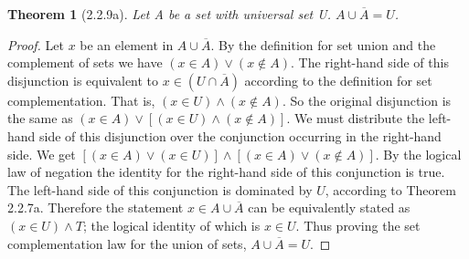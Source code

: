 \documentclass[a4paper, 12pt]{article}
\theoremstyle{plain}
\newtheorem*{theorem*}{Theorem}
\begin{document}
	
	\begin{theorem*}[2.2.9a]
		Let A be a set with universal set U. $A \cup \overline{A} = U$.
	\end{theorem*}
	
	\begin{proof}
		Let $x$ be an element in $A \cup \overline{A}$. By the definition for set union and the complement of sets we have $(x \in A) \lor (x \notin A)$. The right-hand side of this disjunction is equivalent to $x \in (U \cap \overline{A})$ according to the definition for set complementation. That is, $(x \in U) \land (x \notin A)$. So the original disjunction is the same as $(x \in A) \lor [(x \in U) \land (x \notin A)]$. We must distribute the left-hand side of this disjunction over the conjunction occurring in the right-hand side. We get $[(x \in A) \lor (x \in U)] \land [(x \in A) \lor (x \notin A)]$. By the logical law of negation the identity for the right-hand side of this conjunction is true. The left-hand side of this conjunction is dominated by $U$, according to Theorem 2.2.7a. Therefore the statement $x \in A \cup \overline{A}$ can be equivalently stated as $(x \in U) \land T$; the logical identity of which is $x \in U$. Thus proving the set complementation law for the union of sets, $A \cup \overline{A} = U$.

		
	\end{proof}
\end{document}
